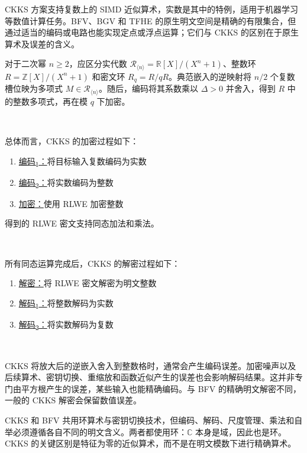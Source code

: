 CKKS 方案支持复数上的 SIMD 近似算术，实数是其中的特例，适用于机器学习等数值计算任务。BFV、BGV 和 TFHE 的原生明文空间是精确的有限集合，但通过适当的编码或电路也能实现定点或浮点运算；它们与 CKKS 的区别在于原生算术及误差的含义。~\cite{ckks-original}

对于二次幂 $n\geq 2$，应区分实代数 $\mathcal{R}_{\langle n\rangle}=\mathbb{R}[X]/(X^n+1)$、整数环 $R=\mathbb{Z}[X]/(X^n+1)$ 和密文环 $R_q=R/qR$。典范嵌入的逆映射将 $n/2$ 个复数槽位映为多项式 $M\in\mathcal{R}_{\langle n\rangle}$。随后，编码将其系数乘以 $\Delta>0$ 并舍入，得到 $R$ 中的整数多项式，再在模 $q$ 下加密。


$ $

\noindent 总体而言，CKKS 的加密过程如下：

\begin{enumerate}
\item \underline{\textsf{编码\textsubscript{1}}：}将目标输入复数编码为实数
\item \underline{\textsf{编码\textsubscript{2}}：}将实数编码为整数
\item \underline{\textsf{加密}：}使用 RLWE 加密整数
\end{enumerate}
得到的 RLWE 密文支持同态加法和乘法。

$ $

\noindent 所有同态运算完成后，CKKS 的解密过程如下：

\begin{enumerate}
\item \underline{\textsf{解密}：}将 RLWE 密文解密为明文整数
\item \underline{\textsf{解码\textsubscript{1}}：}将整数解码为实数
\item \underline{\textsf{解码\textsubscript{2}}：}将实数解码为复数
\end{enumerate}

$ $

CKKS 将放大后的逆嵌入舍入到整数格时，通常会产生编码误差。加密噪声以及后续算术、密钥切换、重缩放和函数近似产生的误差也会影响解码结果。这并非专门由平方根产生的误差，某些输入也能精确编码。与 BFV 的精确明文解密不同，一般的 CKKS 解密会保留数值误差。

CKKS 和 BFV 共用环算术与密钥切换技术，但编码、解码、尺度管理、乘法和自举必须遵循各自不同的明文含义。两者都使用环：$\mathbb{C}$ 本身是域，因此也是环。CKKS 的关键区别是特征为零的近似算术，而不是在明文模数下进行精确算术。



